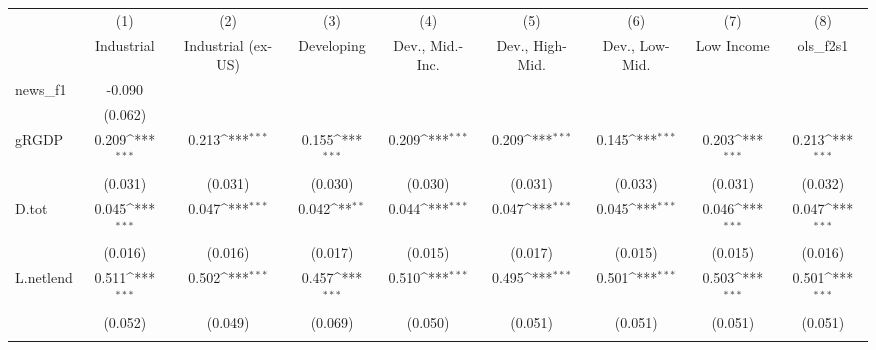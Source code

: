 {
\def\sym#1{\ifmmode^{#1}\else\(^{#1}\)\fi}
\begin{tabular}{l*{8}{c}}
\toprule
            &\multicolumn{1}{c}{(1)}&\multicolumn{1}{c}{(2)}&\multicolumn{1}{c}{(3)}&\multicolumn{1}{c}{(4)}&\multicolumn{1}{c}{(5)}&\multicolumn{1}{c}{(6)}&\multicolumn{1}{c}{(7)}&\multicolumn{1}{c}{(8)}\\
            &\multicolumn{1}{c}{Industrial}&\multicolumn{1}{c}{Industrial (ex-US)}&\multicolumn{1}{c}{Developing}&\multicolumn{1}{c}{Dev., Mid.-Inc.}&\multicolumn{1}{c}{Dev., High-Mid.}&\multicolumn{1}{c}{Dev., Low-Mid.}&\multicolumn{1}{c}{Low Income}&\multicolumn{1}{c}{ols\_f2s1}\\
\midrule
news\_f1     &      -0.090         &                     &                     &                     &                     &                     &                     &                     \\
            &     (0.062)         &                     &                     &                     &                     &                     &                     &                     \\
\addlinespace
gRGDP       &       0.209\sym{***}&       0.213\sym{***}&       0.155\sym{***}&       0.209\sym{***}&       0.209\sym{***}&       0.145\sym{***}&       0.203\sym{***}&       0.213\sym{***}\\
            &     (0.031)         &     (0.031)         &     (0.030)         &     (0.030)         &     (0.031)         &     (0.033)         &     (0.031)         &     (0.032)         \\
\addlinespace
D.tot       &       0.045\sym{***}&       0.047\sym{***}&       0.042\sym{**} &       0.044\sym{***}&       0.047\sym{***}&       0.045\sym{***}&       0.046\sym{***}&       0.047\sym{***}\\
            &     (0.016)         &     (0.016)         &     (0.017)         &     (0.015)         &     (0.017)         &     (0.015)         &     (0.015)         &     (0.016)         \\
\addlinespace
L.netlend   &       0.511\sym{***}&       0.502\sym{***}&       0.457\sym{***}&       0.510\sym{***}&       0.495\sym{***}&       0.501\sym{***}&       0.503\sym{***}&       0.501\sym{***}\\
            &     (0.052)         &     (0.049)         &     (0.069)         &     (0.050)         &     (0.051)         &     (0.051)         &     (0.051)         &     (0.051)         \\
\addlinespace

\end{tabular}}
